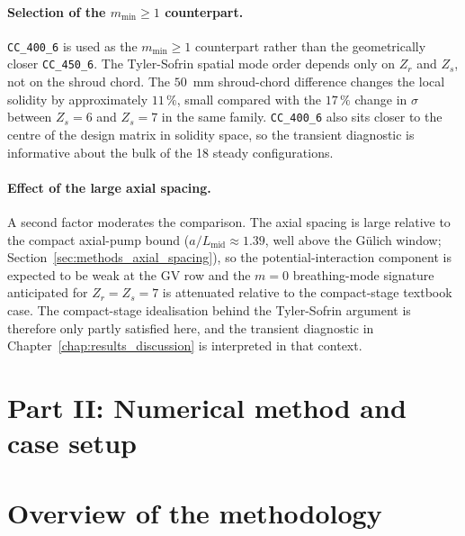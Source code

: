 \paragraph{Selection of the $m_{\min}\geq 1$ counterpart.}
\texttt{CC\_400\_6} is used as the $m_{\min}\geq 1$ counterpart rather than the geometrically closer \texttt{CC\_450\_6}. The Tyler-Sofrin spatial mode order depends only on $Z_r$ and $Z_s$, not on the shroud chord. The $50$~mm shroud-chord difference changes the local solidity by approximately $11\,\%$, small compared with the $17\,\%$ change in $\sigma$ between $Z_s=6$ and $Z_s=7$ in the same family. \texttt{CC\_400\_6} also sits closer to the centre of the design matrix in solidity space, so the transient diagnostic is informative about the bulk of the 18 steady configurations.

\paragraph{Effect of the large axial spacing.}
A second factor moderates the comparison. The axial spacing is large relative to the compact axial-pump bound ($a/L_{\mathrm{mid}} \approx 1.39$, well above the G\"ulich window; Section~\ref{sec:methods_axial_spacing}), so the potential-interaction component is expected to be weak at the GV row and the $m=0$ breathing-mode signature anticipated for $Z_r = Z_s = 7$ is attenuated relative to the compact-stage textbook case. The compact-stage idealisation behind the Tyler-Sofrin argument is therefore only partly satisfied here, and the transient diagnostic in Chapter~\ref{chap:results_discussion} is interpreted in that context.

\section*{Part II: Numerical method and case setup}
\section{Overview of the methodology}
\label{sec:methods_overview_master}
 
